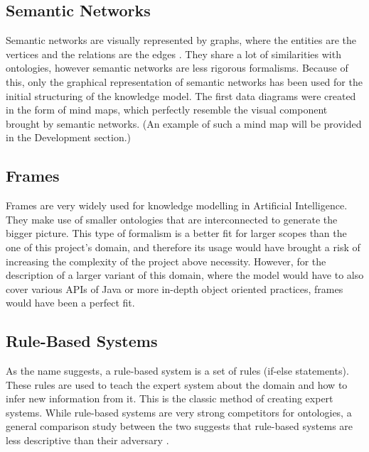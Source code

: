 \documentclass[12pt]{report}
\begin{document}
    \subsection{Semantic Networks}
    Semantic networks are visually represented by graphs, where the entities are the vertices and the relations are the edges \cite{semnet}. They share a lot of similarities with ontologies, however semantic networks are less rigorous formalisms. \cite{semnetvsonto}
    \newline
    Because of this, only the graphical representation of semantic networks has been used for the initial structuring of the knowledge model. The first data diagrams were created in the form of mind maps, which perfectly resemble the visual component brought by semantic networks. (An example of such a mind map will be provided in the Development section.)

    \subsection{Frames}
    Frames are very widely used for knowledge modelling in Artificial Intelligence. They make use of smaller ontologies that are interconnected to generate the bigger picture.
    \newline
    This type of formalism is a better fit for larger scopes than the one of this project's domain, and therefore its usage would have brought a risk of increasing the complexity of the project above necessity. However, for the description of a larger variant of this domain, where the model would have to also cover various APIs of Java or more in-depth object oriented practices, frames would have been a perfect fit.
    
    \subsection{Rule-Based Systems}
    As the name suggests, a rule-based system is a set of rules (if-else statements). These rules are used to teach the expert system about the domain and how to infer new information from it. This is the classic method of creating expert systems.
    \newline
    While rule-based systems are very strong competitors for ontologies, a general comparison study between the two suggests that rule-based systems are less descriptive than their adversary \cite{rulesvsonto}.
    
\end{document}
